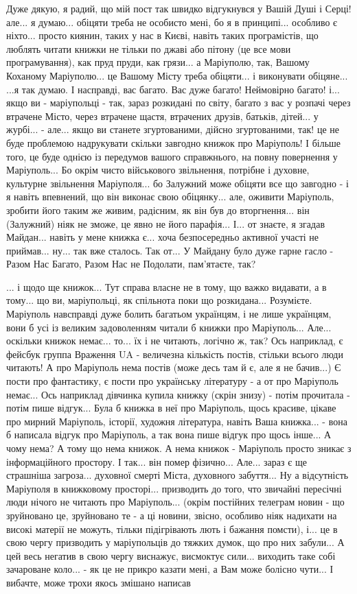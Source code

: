 Дуже дякую, я радий, що мій пост так швидко відгукнувся у Вашій Душі і Серці!
але... я думаю... обіцяти треба не особисто мені, бо я в принципі... особливо є
ніхто... просто киянин, таких у нас в Києві, навіть таких програмістів, що
люблять читати книжки не тільки по джаві або пітону (це все мови
програмування), как пруд пруди, как грязи... а Маріуполю, так, Вашому Коханому
Маріуполю... це Вашому Місту треба обіцяти... і виконувати обіцяне... ...я так
думаю. І насправді, вас багато. Вас дуже багато! Неймовірно багато! і... якщо
ви - маріупольці - так, зараз розкидані по світу, багато з вас у розпачі через
втрачене Місто, через втрачене щастя, втрачених друзів, батьків, дітей... у
журбі... - але... якщо ви станете згуртованими, дійсно згуртованими, так! це не
буде проблемою надрукувати скільки завгодно книжок про Маріуполь! І більше
того, це буде однією із передумов вашого справжнього, на повну повернення у
Маріуполь... Бо окрім чисто військового звільнення, потрібне і духовне,
культурне звільнення Маріуполя... бо Залужний може обіцяти все що завгодно - і
я навіть впевнений, що він виконає свою обіцянку... але, оживити Маріуполь,
зробити його таким же живим, радісним, як він був до вторгнення... він
(Залужний) ніяк не зможе, це явно не його парафія... І... от знаєте, я згадав
Майдан... навіть у мене книжка є... хоча безпосередньо активної участі не
приймав... ну... так вже сталось. Так от... У Майдану було дуже гарне гасло -
Разом Нас Багато, Разом Нас не Подолати, пам'ятаєте, так?

... і щодо ще книжок... Тут справа власне не в тому, що важко видавати, а в
тому... що ви, маріупольці, як спільнота поки що розкидана... Розумієте.
Маріуполь навсправді дуже болить багатьом українцям, і не лише українцям, вони
б усі із великим задоволенням читали б книжки про Маріуполь... Але... оскільки
книжок немає... то... їх і не читають, логічно ж, так? Ось наприклад, є фейсбук
группа Враження UA - величезна кількість постів, стільки всього люди читають! А
про Маріуполь нема постів (може десь там й є, але я не бачив...) Є пости про
фантастику, є пости про українську літературу - а от про Маріуполь немає... Ось
наприклад дівчинка купила книжку (скрін знизу) - потім прочитала - потім пише
відгук... Була б книжка в неї про Маріуполь, щось красиве, цікаве про мирний
Маріуполь, історії, художня література, навіть Ваша книжка... - вона б написала
відгук про Маріуполь, а так вона пише відгук про щось інше... А чому нема? А
тому що нема книжок. А нема книжок - Маріуполь просто зникає з інформаційного
простору. І так... він помер фізично... Але... зараз є ще страшніша загроза...
духовної смерті Міста, духовного забуття... Ну а відсутність Маріуполя в
книжковому просторі... призводить до того, что звичайні пересічні люди нічого
не читають про Маріуполь... (окрім постійних телеграм новин - що зруйновано це,
зруйновано те - а ці новини, звісно, особливо ніяк надихати на високі матерії
не можуть, тільки підігрівають лють і бажання помсти), і... це в свою чергу
призводить у маріупольців до тяжких думок, що про них забули... А цей весь
негатив в свою чергу виснажує, висмоктує сили... виходить таке собі зачароване
коло... - як це не прикро казати мені, а Вам може болісно чути... І вибачте,
може трохи якось змішано написав

